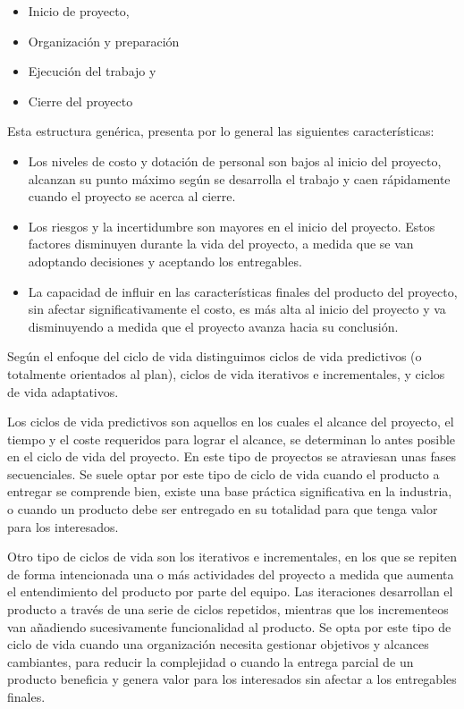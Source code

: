 \begin{itemize}
\item{Inicio de proyecto,}
\item{Organización y preparación}
\item{Ejecución del trabajo y}
\item{Cierre del proyecto}
\end{itemize}

Esta estructura genérica, presenta por lo general las siguientes características:

\begin{itemize}

\item{Los  niveles  de  costo  y  dotación  de  personal  son  bajos  al  inicio  del  proyecto,  alcanzan  su  punto  máximo según se desarrolla el trabajo y caen rápidamente cuando el proyecto se acerca al cierre.}

\item{Los  riesgos  y  la  incertidumbre son  mayores  en  el  inicio  del  proyecto. Estos factores disminuyen durante la vida del proyecto, a medida que se van adoptando decisiones y aceptando los entregables.}

\item{La  capacidad  de  influir  en  las  características  finales  del  producto  del  proyecto,  sin  afectar  significativamente  el  costo,  es  más  alta  al  inicio  del  proyecto  y  va  disminuyendo  a  medida  que  el  proyecto  avanza  hacia  su  conclusión.}

\end{itemize}

Según el enfoque del ciclo de vida distinguimos ciclos de vida predictivos (o totalmente orientados al plan), ciclos de vida iterativos e incrementales, y ciclos de vida adaptativos.

Los ciclos de vida predictivos son aquellos en los cuales el alcance del proyecto, el tiempo y el coste requeridos para lograr el alcance, se determinan lo antes posible en el ciclo de vida del proyecto. En este tipo de proyectos se atraviesan unas fases secuenciales. Se suele optar por este tipo de ciclo de vida cuando el producto a entregar se comprende bien, existe una base práctica significativa en la industria, o cuando un producto debe ser entregado en su totalidad para que tenga valor para los interesados.

Otro tipo de ciclos de vida son los iterativos e incrementales, en los que se repiten de forma intencionada una o más actividades del proyecto a medida que aumenta el entendimiento del producto por parte del equipo. Las iteraciones desarrollan el producto a través de una serie de ciclos repetidos, mientras que los incrementeos van añadiendo sucesivamente funcionalidad al producto. Se opta por este tipo de ciclo de vida cuando una organización necesita gestionar objetivos y alcances cambiantes, para reducir la complejidad o cuando la entrega parcial de un producto beneficia y genera valor para los interesados sin afectar a los entregables finales.

